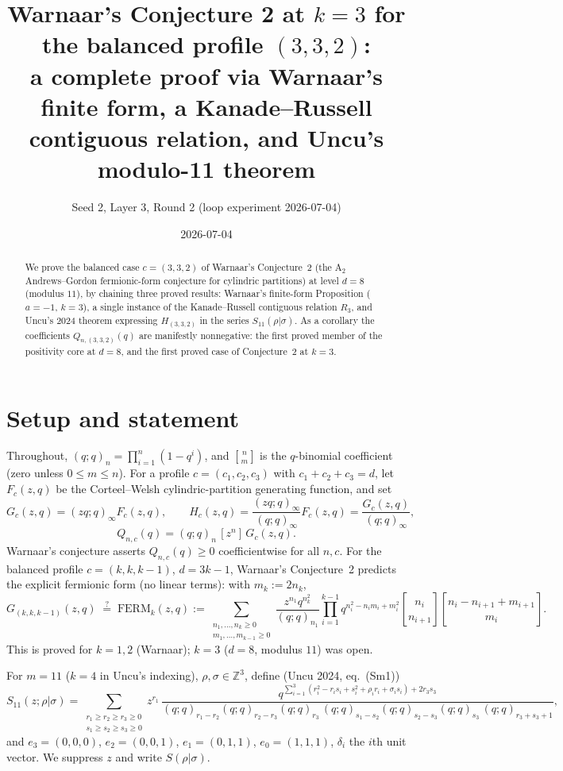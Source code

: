 \documentclass[11pt]{article}
\title{Warnaar's Conjecture 2 at $k=3$ for the balanced profile $(3,3,2)$:\\
a complete proof via Warnaar's finite form, a Kanade--Russell contiguous
relation, and Uncu's modulo-11 theorem}
\author{Seed 2, Layer 3, Round 2 (loop experiment 2026-07-04)}
\date{2026-07-04}
\newcommand{\qbin}[2]{\genfrac{[}{]}{0pt}{}{#1}{#2}}
\newcommand{\poch}[1]{(q;q)_{#1}}
\begin{document}
\maketitle

\begin{abstract}
We prove the balanced case $c=(3,3,2)$ of Warnaar's Conjecture~2 (the
$\mathrm{A}_2$ Andrews--Gordon fermionic-form conjecture for cylindric
partitions) at level $d=8$ (modulus $11$), by chaining three proved results:
Warnaar's finite-form Proposition ($a=-1$, $k=3$), a single instance of the
Kanade--Russell contiguous relation $R_3$, and Uncu's 2024 theorem expressing
$H_{(3,3,2)}$ in the series $S_{11}(\rho|\sigma)$. As a corollary the
coefficients $Q_{n,(3,3,2)}(q)$ are manifestly nonnegative: the first proved
member of the positivity core at $d=8$, and the first proved case of
Conjecture~2 at $k=3$.
\end{abstract}

\section{Setup and statement}

Throughout, $\poch{n}=\prod_{i=1}^n(1-q^i)$, and $\qbin{n}{m}$ is the
$q$-binomial coefficient (zero unless $0\le m\le n$). For a profile
$c=(c_1,c_2,c_3)$ with $c_1+c_2+c_3=d$, let $F_c(z,q)$ be the
Corteel--Welsh cylindric-partition generating function, and set
\[
G_c(z,q)=(zq;q)_\infty F_c(z,q),\qquad
H_c(z,q)=\frac{(zq;q)_\infty}{(q;q)_\infty}F_c(z,q)=\frac{G_c(z,q)}{(q;q)_\infty},
\]
\[
Q_{n,c}(q)=\poch{n}\,[z^n]\,G_c(z,q).
\]
Warnaar's conjecture asserts $Q_{n,c}(q)\ge 0$ coefficientwise for all
$n,c$. For the balanced profile $c=(k,k,k-1)$, $d=3k-1$, Warnaar's
Conjecture~2 predicts the explicit fermionic form (no linear terms): with
$m_k:=2n_k$,
\begin{equation}\label{eq:ferm}
G_{(k,k,k-1)}(z,q)\;\overset{?}{=}\;
\mathrm{FERM}_k(z,q):=
\sum_{\substack{n_1,\dots,n_k\ge 0\\ m_1,\dots,m_{k-1}\ge 0}}
\frac{z^{n_1}q^{n_k^2}}{\poch{n_1}}
\prod_{i=1}^{k-1}q^{n_i^2-n_im_i+m_i^2}
\qbin{n_i}{n_{i+1}}\qbin{n_i-n_{i+1}+m_{i+1}}{m_i}.
\end{equation}
This is proved for $k=1,2$ (Warnaar); $k=3$ ($d=8$, modulus $11$) was open.

For $m=11$ ($k=4$ in Uncu's indexing), $\rho,\sigma\in\mathbb{Z}^3$, define
(Uncu 2024, eq.\ (Sm1))
\begin{equation}\label{eq:S11}
S_{11}(z;\rho|\sigma)=
\sum_{\substack{r_1\ge r_2\ge r_3\ge 0\\ s_1\ge s_2\ge s_3\ge 0}}
z^{r_1}\,
\frac{q^{\sum_{i=1}^{3}(r_i^2-r_is_i+s_i^2+\rho_ir_i+\sigma_is_i)+2r_3s_3}}
{\poch{r_1-r_2}\poch{r_2-r_3}\poch{r_3}\,
 \poch{s_1-s_2}\poch{s_2-s_3}\poch{s_3}\,\poch{r_3+s_3+1}},
\end{equation}
and $e_3=(0,0,0)$, $e_2=(0,0,1)$, $e_1=(0,1,1)$, $e_0=(1,1,1)$,
$\delta_i$ the $i$th unit vector. We suppress $z$ and write
$S(\rho|\sigma)$.
\end{document}
